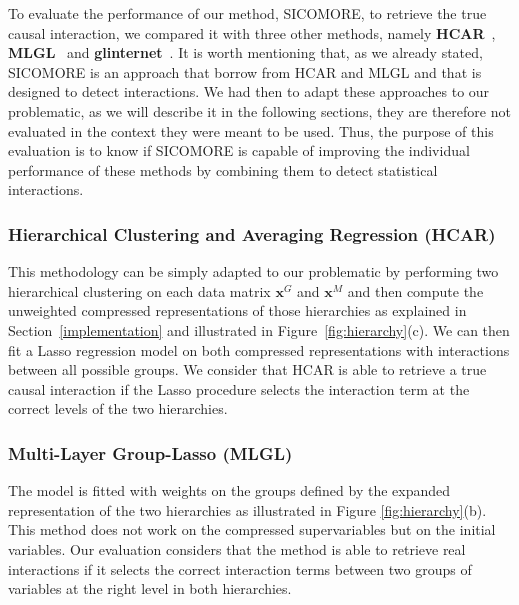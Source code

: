 \documentclass[]{book}
\begin{document}
To evaluate the performance of our method, SICOMORE, to retrieve the
true causal interaction, we compared it with three other methods, namely
\textbf{HCAR}~\citep{park_averaged_2007}, \textbf{MLGL}~\citep{grimonprez_selection_2016}
and \textbf{glinternet}~\citep{lim2015learning}. It is worth mentioning that, as
we already stated, SICOMORE is an approach that borrow from HCAR and
MLGL and that is designed to detect interactions. We had then to adapt
these approaches to our problematic, as we will describe it in the
following sections, they are therefore not evaluated in the context they
were meant to be used. Thus, the purpose of this evaluation is to know
if SICOMORE is capable of improving the individual performance of these
methods by combining them to detect statistical interactions.

\hypertarget{hierarchical-clustering-and-averaging-regression-hcar}{%
\subsubsection*{Hierarchical Clustering and Averaging Regression (HCAR)}\label{hierarchical-clustering-and-averaging-regression-hcar}}

This methodology can be simply adapted to our problematic by performing
two hierarchical clustering on each data matrix \(\mathbf{x}^{\mathit{G}}\) and
\(\mathbf{x}^{\mathit{M}}\) and then compute the unweighted compressed representations
of those hierarchies as explained in
Section~\ref{implementation} and illustrated in
Figure~\ref{fig:hierarchy}(c). We can then fit a Lasso regression model
on both compressed representations with interactions between all
possible groups. We consider that HCAR is able to retrieve a true
causal interaction if the Lasso procedure selects the interaction term
at the correct levels of the two hierarchies.

\hypertarget{multi-layer-group-lasso-mlgl}{%
\subsubsection*{Multi-Layer Group-Lasso (MLGL)}\label{multi-layer-group-lasso-mlgl}}

The model is fitted with weights on the groups defined by the expanded
representation of the two hierarchies as illustrated in Figure
\ref{fig:hierarchy}(b). This method does not work on the compressed
supervariables but on the initial variables. Our evaluation considers
that the method is able to retrieve real interactions if it selects the
correct interaction terms between two groups of variables at the right
level in both hierarchies.
\end{document}
